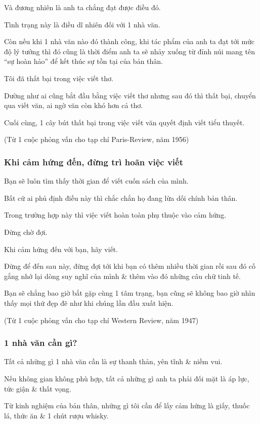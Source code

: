 \documentclass{article}
\begin{document}
Và đương nhiên là anh ta chẳng đạt được điều đó.

Tình trạng này là điều dĩ nhiên đối với 1 nhà văn.

Còn nếu khi 1 nhà văn nào đó thành công, khi tác phẩm của anh ta đạt tới mức độ lý tưởng thì đó cũng là thời điểm anh ta sẽ nhảy xuống từ đỉnh núi mang tên ``sự hoàn hảo'' để kết thúc sự tồn tại của bản thân.

Tôi đã thất bại trong việc viết thơ.

Dường như ai cũng bắt đầu bằng việc viết thơ nhưng sau đó thì thất bại, chuyển qua viết văn, ai ngờ văn còn khó hơn cả thơ.

Cuối cùng, 1 cây bút thất bại trong việc viết văn quyết định viết tiểu thuyết.

(Từ 1 cuộc phỏng vấn cho tạp chí Paris-Review, năm 1956)

\subsubsection{Khi cảm hứng đến, đừng trì hoãn việc viết}
Bạn sẽ luôn tìm thấy thời gian để viết cuốn sách của mình.

Bất cứ ai phủ định điều này thì chắc chắn họ đang lừa dối chính bản thân.

Trong trường hợp này thì việc viết hoàn toàn phụ thuộc vào cảm hứng.

Đừng chờ đợi.

Khi cảm hứng đến với bạn, hãy viết.

Đừng để đến sau này, đừng đợi tới khi bạn có thêm nhiều thời gian rồi sau đó cố gắng nhớ lại dòng suy nghĩ của mình \& thêm vào đó những câu chữ tinh tế.

Bạn sẽ chẳng bao giờ bắt gặp cùng 1 tâm trạng, bạn cũng sẽ không bao giờ nhìn thấy mọi thứ đẹp đẽ như khi chúng lần đầu xuất hiện.

(Từ 1 cuộc phỏng vấn cho tạp chí Western Review, năm 1947)

\subsubsection{1 nhà văn cần gì?}
Tất cả những gì 1 nhà văn cần là sự thanh thản, yên tĩnh \& niềm vui.

Nếu không gian không phù hợp, tất cả những gì anh ta phải đối mặt là áp lực, tức giận \& thất vọng.

Từ kinh nghiệm của bản thân, những gì tôi cần để lấy cảm hứng là giấy, thuốc lá, thức ăn \& 1 chút rượu whisky.
\end{document}
